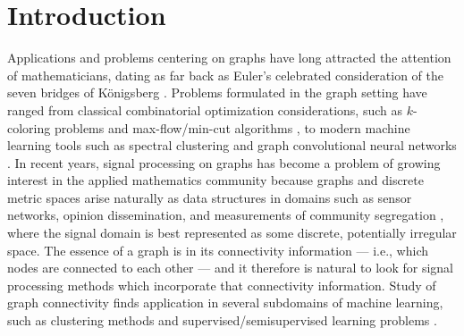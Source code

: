 \documentclass{article}
\begin{document}
\section{Introduction}

Applications and problems centering on graphs have long attracted the attention of mathematicians, dating as far back as Euler's celebrated consideration of the seven bridges of K{\"o}nigsberg \cite{imperatorskaiaakademianaukrussiaCommentariiAcademiaeScientiarum1726}. Problems formulated in the graph setting have ranged from classical combinatorial optimization considerations, such as \(k\)-coloring problems \cite{brooksColouringNodesNetwork1941} and max-flow/min-cut algorithms \cite{jrMaximalFlowNetwork1956}, to modern machine learning tools such as spectral clustering \cite{ngSpectralClusteringAnalysis2001} and graph convolutional neural networks \cite{wuGraphNeuralNetworks2022}. In recent years, signal processing on graphs has become a problem of growing interest in the applied mathematics community because graphs and discrete metric spaces arise naturally as data structures in domains such as sensor networks, opinion dissemination, and measurements of community segregation \cite{stankovicGraphSignalProcessing2019, ruizGraphonSignalProcessing2021, duchinMeasuringSegregationAnalysis2023}, where the signal domain is best represented as some discrete, potentially irregular space.  The essence of a graph is in its connectivity information --- i.e., which nodes are connected to each other --- and it therefore is natural to look for signal processing methods which incorporate that connectivity information. Study of graph connectivity finds application in several subdomains of machine learning, such as clustering methods \cite{ngSpectralClusteringAnalysis2001, roblitzFuzzySpectralClustering2013, nieConstrainedLaplacianRank2016} and supervised/semisupervised learning problems \cite{songGraphBasedSemiSupervisedLearning2023,chenGraphBasedChangePointAnalysis2023, huangLaplacianChangePoint2020}.
\end{document}

